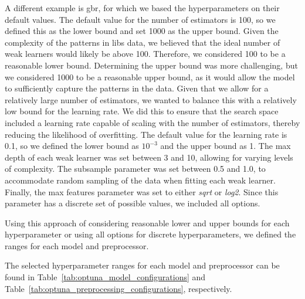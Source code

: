 A different example is \gls{gbr}, for which we based the hyperparameters on their default values.
The default value for the number of estimators is 100, so we defined this as the lower bound and set 1000 as the upper bound.
Given the complexity of the patterns in \gls{libs} data, we believed that the ideal number of weak learners would likely be above 100.
Therefore, we considered 100 to be a reasonable lower bound. 
Determining the upper bound was more challenging, but we considered 1000 to be a reasonable upper bound, as it would allow the model to sufficiently capture the patterns in the data.
Given that we allow for a relatively large number of estimators, we wanted to balance this with a relatively low bound for the learning rate. 
We did this to ensure that the search space included a learning rate capable of scaling with the number of estimators, thereby reducing the likelihood of overfitting.
The default value for the learning rate is 0.1, so we defined the lower bound as $10^{-3}$ and the upper bound as 1. 
The max depth of each weak learner was set between 3 and 10, allowing for varying levels of complexity.
The subsample parameter was set between 0.5 and 1.0, to accommodate random sampling of the data when fitting each weak learner. 
Finally, the max features parameter was set to either \textit{sqrt} or \textit{log2}. Since this parameter has a discrete set of possible values, we included all options.

Using this approach of considering reasonable lower and upper bounds for each hyperparameter or using all options for discrete hyperparameters, we defined the ranges for each model and preprocessor.

The selected hyperparameter ranges for each model and preprocessor can be found in Table~\ref{tab:optuna_model_configurations} and Table~\ref{tab:optuna_preprocessing_configurations}, respectively.


